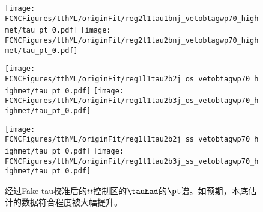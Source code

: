 \begin{figure}[H]
\centering
\texttt{[image: \\FCNCFigures/tthML/originFit/reg2l1tau1bnj\_vetobtagwp70\_highmet/tau\_pt\_0.pdf]}
\texttt{[image: \\FCNCFigures/tthML/originFit/reg2l1tau2bnj\_vetobtagwp70\_highmet/tau\_pt\_0.pdf]}

\texttt{[image: \\FCNCFigures/tthML/originFit/reg1l1tau2b2j\_os\_vetobtagwp70\_highmet/tau\_pt\_0.pdf]}
\texttt{[image: \\FCNCFigures/tthML/originFit/reg1l1tau2b3j\_os\_vetobtagwp70\_highmet/tau\_pt\_0.pdf]}

\texttt{[image: \\FCNCFigures/tthML/originFit/reg1l1tau2b2j\_ss\_vetobtagwp70\_highmet/tau\_pt\_0.pdf]}
\texttt{[image: \\FCNCFigures/tthML/originFit/reg1l1tau2b3j\_ss\_vetobtagwp70\_highmet/tau\_pt\_0.pdf]}

\caption{经过Fake tau校准后的$t\bar{t}$控制区的$\tauhad$的$\pt$谱。如预期，本底估计的数据符合程度被大幅提升。}
\label{fig:wjet_pt_postfit_CR}
\end{figure}
